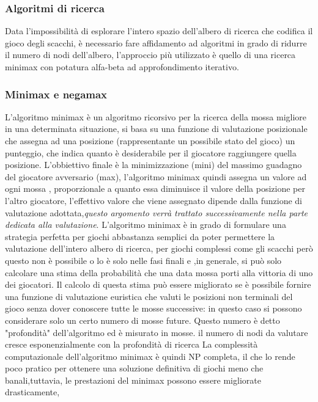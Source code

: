 \subsubsection{Algoritmi di ricerca}
Data l'impossibilità di esplorare l'intero spazio dell'albero di ricerca che codifica il gioco degli scacchi, è necessario fare affidamento ad algoritmi in
grado di ridurre il numero di nodi dell'albero, l'approccio più utilizzato è quello di una ricerca minimax con potatura alfa-beta ad approfondimento iterativo.


\subsubsection{Minimax e negamax}
L'algoritmo minimax\cite{itwiki:125837390} è un algoritmo ricorsivo per la ricerca della mossa migliore in una determinata situazione, si basa su una funzione di valutazione posizionale che assegna ad una posizione (rappresentante un possibile stato del gioco) un punteggio,
che indica quanto è desiderabile per il giocatore raggiungere quella posizione.
L'obbiettivo finale è la minimizzazione (mini) del massimo guadagno del giocatore avversario (max),
l'algoritmo minimax quindi  assegna un valore ad ogni mossa , proporzionale a quanto essa diminuisce il valore della posizione per l'altro giocatore,
l'effettivo valore che viene assegnato dipende dalla funzione di valutazione adottata,\emph{questo argomento verrà trattato successivamente nella parte dedicata alla valutazione}.
L'algoritmo minimax è in grado di formulare una strategia perfetta per giochi abbastanza semplici da poter permettere 
la valutazione dell'intero albero di ricerca, per giochi complessi come gli scacchi però questo non è possibile o lo è 
solo nelle fasi finali e ,in generale, si può solo calcolare una stima della probabilità che una data mossa porti alla vittoria di uno dei giocatori.
Il calcolo di questa stima può essere migliorato se è possibile fornire una funzione di valutazione euristica che
valuti le posizioni non terminali del gioco senza dover conoscere tutte le mosse successive: in questo caso si possono
considerare solo un certo numero di mosse future. Questo numero è detto "profondità" dell'algoritmo ed è misurato
in mosse. il numero di nodi da valutare cresce esponenzialmente con la profondità di ricerca La complessità computazionale dell'algoritmo minimax è quindi 
NP completa, il che lo rende poco pratico per ottenere una soluzione definitiva di giochi meno che banali,tuttavia, le prestazioni del minimax possono essere migliorate drasticamente,
